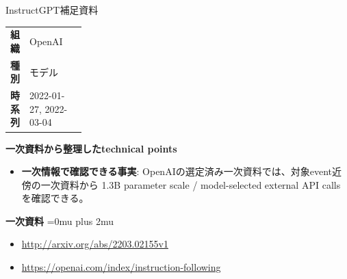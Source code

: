 \begin{technicalnote}{InstructGPT}{補足資料}
\begingroup
\begin{tabularx}{\linewidth}{@{}>{\bfseries}p{0.22\linewidth}X@{}}
組織 & OpenAI \\
種別 & モデル \\
時系列 & 2022-01-27, 2022-03-04 \\
\end{tabularx}
\smallskip
{\bfseries 一次資料から整理したtechnical points}
\begin{itemize}[leftmargin=1.5em,itemsep=0.35em]
\item \textbf{一次情報で確認できる事実}: OpenAIの選定済み一次資料では、対象event近傍の一次資料から 1.3B parameter scale / model-selected external API calls を確認できる。
\end{itemize}
\begin{minipage}{\linewidth}
\begin{samepage}
{\bfseries 一次資料}
\begingroup\sloppy
\Urlmuskip=0mu plus 2mu\relax
\begin{itemize}[leftmargin=1.5em,itemsep=0.25em]
\item {\scriptsize\url{http://arxiv.org/abs/2203.02155v1}}
\item {\scriptsize\url{https://openai.com/index/instruction-following}}
\end{itemize}
\endgroup
\end{samepage}
\end{minipage}
\endgroup
\end{technicalnote}
\medskip

